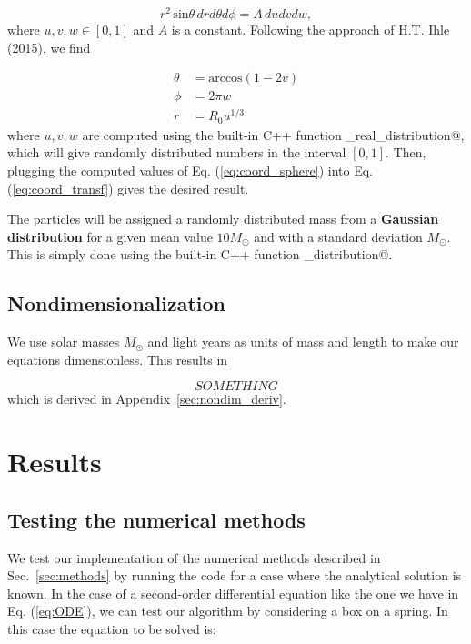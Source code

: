 \documentclass{article}
\begin{document}
\begin{multicols}{2}
\begin{equation*}
	r^2 \, \mathrm{sin} \theta \, dr d\theta d\phi = A \, du dv dw,
\end{equation*}
where $u,v,w \in [0,1]$ and $A$ is a constant. Following the approach of H.T. Ihle (2015), we find 

\begin{equation}\label{eq:coord_sphere}
\begin{aligned}
	\theta &= \mathrm{arccos}(1 - 2v) \\
	\phi &= 2\pi w \\
	r &= R_0 u^{1/3}
\end{aligned}
\end{equation}
where $u,v,w$ are computed using the built-in C++ function \verb@uniform_real_distribution@, which will give randomly distributed numbers in the interval $[0,1]$. Then, plugging the computed values of Eq. (\ref{eq:coord_sphere}) into Eq. (\ref{eq:coord_transf}) gives the desired result. 

The particles will be assigned a randomly distributed mass from a \textbf{Gaussian distribution} for a given mean value $10 M_{\odot}$ and with a standard deviation $M_{\odot}$. This is simply done using the built-in C++ function \verb@normal_distribution@.  



\subsection{Nondimensionalization}\label{sec:nondim}
We use solar masses $M_{\odot}$ and light years as units of mass and length to make our equations dimensionless. This results in

\begin{equation}
	SOMETHING
\end{equation}
which is derived in Appendix~\ref{sec:nondim_deriv}.



\section{Results}

\subsection{Testing the numerical methods}\label{sec:analytical_test}

We test our implementation of the numerical methods described in Sec.~\ref{sec:methods} by running the code for a case where the analytical solution is known. In the case of a second-order differential equation like the one we have in Eq. (\ref{eq:ODE}), we can test our algorithm by considering a box on a spring. In this case the equation to be solved is:


\end{multicols}
\end{document}
